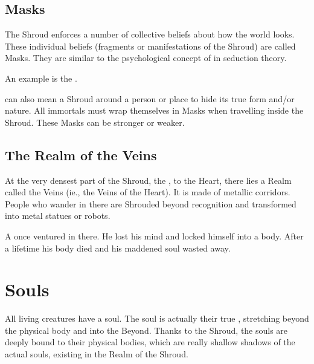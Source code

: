 \subsection{Masks}
The Shroud enforces a number of collective beliefs about how the world looks. 
These individual beliefs (fragments or manifestations of the Shroud) are called Masks. 
They are similar to the psychological concept of  in seduction theory. 

An example is the . 

 can also mean a Shroud around a person or place to hide its true form and/or nature. 
All immortals must wrap themselves in Masks when travelling inside the Shroud. 
These Masks can be stronger or weaker. 









\subsection{The Realm of the Veins}
At the very densest part of the Shroud, the ,  to the Heart, there lies a Realm called the Veins (ie., the Veins of the Heart). 
It is made of metallic corridors. 
People who wander in there are Shrouded beyond recognition and transformed into metal statues or robots. 

A \resphan{} once ventured in there. 
He lost his mind and locked himself into a \human{} body. 
After a \human{} lifetime his body died and his maddened soul wasted away. 















\section{Souls}
All living creatures have a soul. The soul is actually their true , stretching beyond the physical body and into the Beyond. Thanks to the Shroud, the souls are deeply bound to their physical bodies, which are really shallow shadows of the actual souls, existing in the Realm of the Shroud. 

